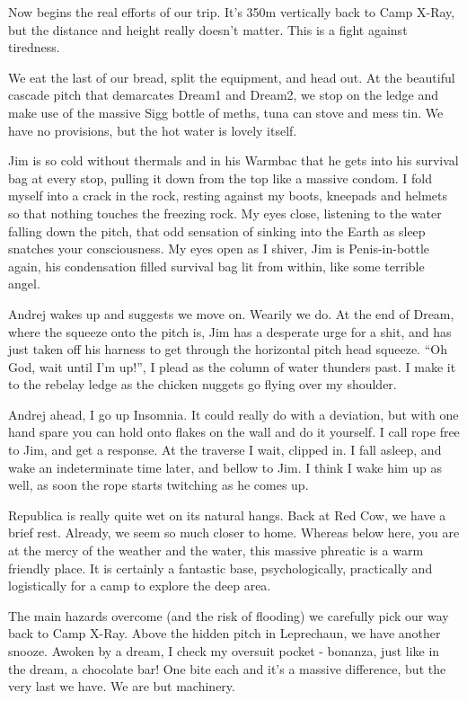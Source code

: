 Now begins the real efforts of our trip. It's 350m vertically back to
Camp X-Ray, but the distance and height really doesn't matter. This is a
fight against tiredness.

We eat the last of our bread, split the equipment, and head out. At the
beautiful cascade pitch that demarcates Dream1 and Dream2, we stop on
the ledge and make use of the massive Sigg bottle of meths, tuna can
stove and mess tin. We have no provisions, but the hot water is lovely
itself.

Jim is so cold without thermals and in his Warmbac that he gets into his
survival bag at every stop, pulling it down from the top like a massive
condom. I fold myself into a crack in the rock, resting against my
boots, kneepads and helmets so that nothing touches the freezing rock.
My eyes close, listening to the water falling down the pitch, that odd
sensation of sinking into the Earth as sleep snatches your
consciousness. My eyes open as I shiver, Jim is Penis-in-bottle again,
his condensation filled survival bag lit from within, like some terrible
angel.

Andrej wakes up and suggests we move on. Wearily we do. At the end of
Dream, where the squeeze onto the pitch is, Jim has a desperate urge for
a shit, and has just taken off his harness to get through the horizontal
pitch head squeeze. ``Oh God, wait until I'm up!'', I plead as the
column of water thunders past. I make it to the rebelay ledge as the
chicken nuggets go flying over my shoulder.

Andrej ahead, I go up Insomnia. It could really do with a deviation, but
with one hand spare you can hold onto flakes on the wall and do it
yourself. I call rope free to Jim, and get a response. At the traverse I
wait, clipped in. I fall asleep, and wake an indeterminate time later,
and bellow to Jim. I think I wake him up as well, as soon the rope
starts twitching as he comes up.

Republica is really quite wet on its natural hangs. Back at Red Cow, we
have a brief rest. Already, we seem so much closer to home. Whereas
below here, you are at the mercy of the weather and the water, this
massive phreatic is a warm friendly place. It is certainly a fantastic
base, psychologically, practically and logistically for a camp to
explore the deep area.

The main hazards overcome (and the risk of flooding) we carefully pick
our way back to Camp X-Ray. Above the hidden pitch in Leprechaun, we
have another snooze. Awoken by a dream, I check my oversuit pocket -
bonanza, just like in the dream, a chocolate bar! One bite each and it's
a massive difference, but the very last we have. We are but machinery.

